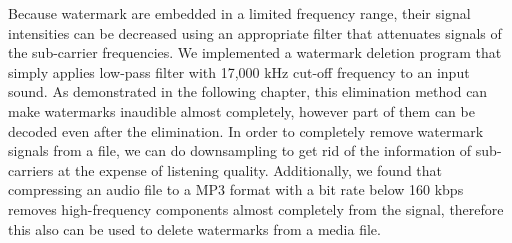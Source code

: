 Because watermark are embedded in a limited frequency range, their signal intensities can be decreased using an appropriate filter that attenuates signals of the sub-carrier frequencies.
We implemented a watermark deletion program that simply applies low-pass filter with 17,000 kHz cut-off frequency to an input sound.
As demonstrated in the following chapter, this elimination method can make watermarks inaudible almost completely, however part of them can be decoded even after the elimination.
In order to completely remove watermark signals from a file, we can do downsampling to get rid of the information of sub-carriers at the expense of listening quality.
Additionally, we found that compressing an audio file to a MP3 format with a bit rate below 160 kbps removes high-frequency components almost completely from the signal, therefore this also can be used to delete watermarks from a media file.
